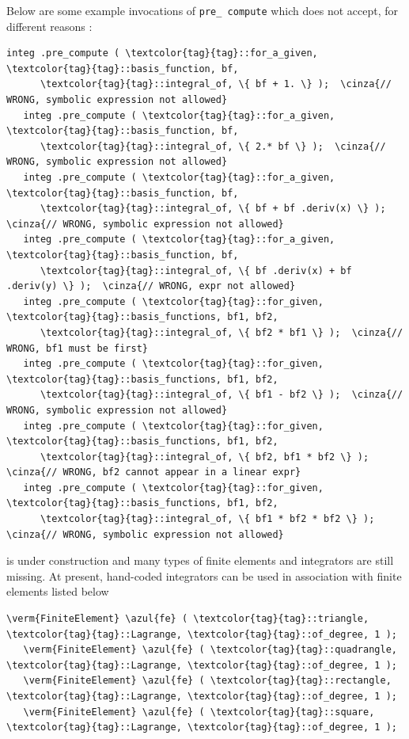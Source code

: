 Below are some example invocations of {\small\tt pre\_\,compute} which {\maniFEM} does not accept,
for different reasons :

\begin{Verbatim}[commandchars=\\\{\},formatcom=\small\tt,
   baselinestretch=0.94,framesep=2mm                      ]
   integ .pre_compute ( \textcolor{tag}{tag}::for_a_given, \textcolor{tag}{tag}::basis_function, bf,
      \textcolor{tag}{tag}::integral_of, \{ bf + 1. \} );  \cinza{// WRONG, symbolic expression not allowed}
   integ .pre_compute ( \textcolor{tag}{tag}::for_a_given, \textcolor{tag}{tag}::basis_function, bf,
      \textcolor{tag}{tag}::integral_of, \{ 2.* bf \} );  \cinza{// WRONG, symbolic expression not allowed}
   integ .pre_compute ( \textcolor{tag}{tag}::for_a_given, \textcolor{tag}{tag}::basis_function, bf,
      \textcolor{tag}{tag}::integral_of, \{ bf + bf .deriv(x) \} );  \cinza{// WRONG, symbolic expression not allowed}
   integ .pre_compute ( \textcolor{tag}{tag}::for_a_given, \textcolor{tag}{tag}::basis_function, bf,
      \textcolor{tag}{tag}::integral_of, \{ bf .deriv(x) + bf .deriv(y) \} );  \cinza{// WRONG, expr not allowed}
   integ .pre_compute ( \textcolor{tag}{tag}::for_given, \textcolor{tag}{tag}::basis_functions, bf1, bf2,
      \textcolor{tag}{tag}::integral_of, \{ bf2 * bf1 \} );  \cinza{// WRONG, bf1 must be first}
   integ .pre_compute ( \textcolor{tag}{tag}::for_given, \textcolor{tag}{tag}::basis_functions, bf1, bf2,
      \textcolor{tag}{tag}::integral_of, \{ bf1 - bf2 \} );  \cinza{// WRONG, symbolic expression not allowed}
   integ .pre_compute ( \textcolor{tag}{tag}::for_given, \textcolor{tag}{tag}::basis_functions, bf1, bf2,
      \textcolor{tag}{tag}::integral_of, \{ bf2, bf1 * bf2 \} );  \cinza{// WRONG, bf2 cannot appear in a linear expr}
   integ .pre_compute ( \textcolor{tag}{tag}::for_given, \textcolor{tag}{tag}::basis_functions, bf1, bf2,
      \textcolor{tag}{tag}::integral_of, \{ bf1 * bf2 * bf2 \} );  \cinza{// WRONG, symbolic expression not allowed}
\end{Verbatim}

{\ManiFEM} is under construction and many types of finite elements and integrators are
still missing.
At present, hand-coded integrators can be used in association with finite elements listed below
\begin{Verbatim}[commandchars=\\\{\},formatcom=\small\tt,
   baselinestretch=0.94,framesep=2mm                      ]
   \verm{FiniteElement} \azul{fe} ( \textcolor{tag}{tag}::triangle,   \textcolor{tag}{tag}::Lagrange, \textcolor{tag}{tag}::of_degree, 1 );
   \verm{FiniteElement} \azul{fe} ( \textcolor{tag}{tag}::quadrangle, \textcolor{tag}{tag}::Lagrange, \textcolor{tag}{tag}::of_degree, 1 );
   \verm{FiniteElement} \azul{fe} ( \textcolor{tag}{tag}::rectangle,  \textcolor{tag}{tag}::Lagrange, \textcolor{tag}{tag}::of_degree, 1 );
   \verm{FiniteElement} \azul{fe} ( \textcolor{tag}{tag}::square,     \textcolor{tag}{tag}::Lagrange, \textcolor{tag}{tag}::of_degree, 1 );
\end{Verbatim}

